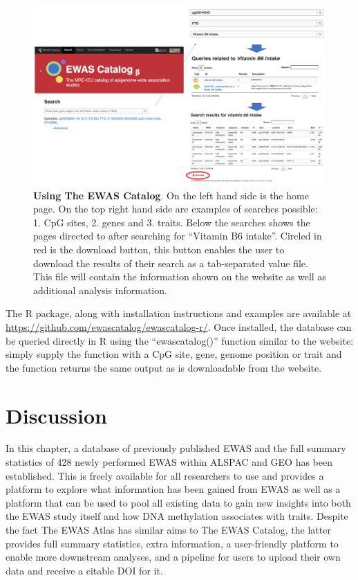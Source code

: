 \documentclass[11pt,oneside]{bristolthesis}
\newcommand{\blandscape}{\begin{landscape}}
\newcommand{\elandscape}{\end{landscape}}
\begin{document}
\blandscape
\begin{figure}[htbp]

{\centering \includegraphics[width=1\linewidth]{figure/03-ewas_catalog/using_the_catalog} 

}

\caption[Using The EWAS Catalog]{\textbf{Using The EWAS Catalog}. On the left hand side is the home page. On the top right hand side are examples of searches possible: 1. CpG sites, 2. genes and 3. traits. Below the searches shows the pages directed to after searching for ``Vitamin B6 intake''. Circled in red is the download button, this button enables the user to download the results of their search as a tab-separated value file. This file will contain the information shown on the website as well as additional analysis information.}\label{fig:catalog-use}
\end{figure}
\elandscape

The R package, along with installation instructions and examples are available at \url{https://github.com/ewascatalog/ewascatalog-r/}. Once installed, the database can be queried directly in R using the ``ewascatalog()'' function similar to the website: simply supply the function with a CpG site, gene, genome position or trait and the function returns the same output as is downloadable from the website.

\hypertarget{discussion-03}{%
\section{Discussion}\label{discussion-03}}

In this chapter, a database of previously published EWAS and the full summary statistics of 428 newly performed EWAS within ALSPAC and GEO has been established. This is freely available for all researchers to use and provides a platform to explore what information has been gained from EWAS as well as a platform that can be used to pool all existing data to gain new insights into both the EWAS study itself and how DNA methylation associates with traits. Despite the fact The EWAS Atlas has similar aims to The EWAS Catalog, the latter provides full summary statistics, extra information, a user-friendly platform to enable more downstream analyses, and a pipeline for users to upload their own data and receive a citable DOI for it.
\end{document}

